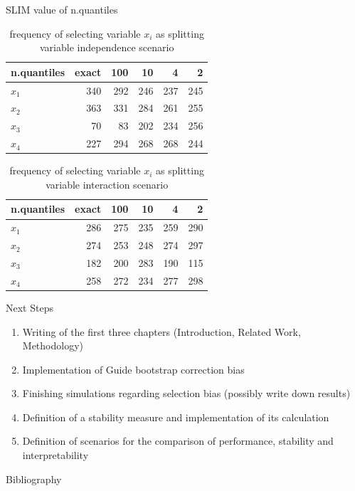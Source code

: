 \documentclass[9pt, xcolor=table]{beamer}
\begin{document}
\begin{frame}{SLIM value of n.quantiles}

\begin{table}

\caption{frequency of selecting variable $x_i$ as splitting variable independence scenario}
\centering
\begin{tabular}[t]{l|r|r|r|r|r}
\hline
n.quantiles  & exact & 100 & 10 & 4 & 2\\
\hline
$x_1$ & 340 & 292 & 246 & 237 & 245\\
\hline
$x_2$ & 363 & 331 & 284 & 261 & 255\\
\hline
$x_3$ & 70 & 83 & 202 & 234 & 256\\
\hline
$x_4$ & 227 & 294 & 268 & 268 & 244\\
\hline
\end{tabular}
\end{table}


\begin{table}
\caption{frequency of selecting variable $x_i$ as splitting variable interaction scenario}
\centering
\begin{tabular}[t]{l|r|r|r|r|r}
\hline
n.quantiles  & exact & 100 & 10 & 4 & 2\\
\hline
$x_1$ & 286 & 275 & 235 & 259 & 290\\
\hline
$x_2$ & 274 & 253 & 248 & 274 & 297\\
\hline
$x_3$ & 182 & 200 & 283 & 190 & 115\\
\hline
$x_4$ & 258 & 272 & 234 & 277 & 298\\
\hline
\end{tabular}
\end{table}


\end{frame}


\begin{frame}{Next Steps}
\begin{enumerate}
    \item Writing of the first three chapters (Introduction, Related Work, Methodology)
    \item Implementation of Guide bootstrap correction bias 
    \item Finishing simulations regarding selection bias (possibly write down results)
    \item Definition of a stability measure and implementation of its calculation
    \item Definition of scenarios for the comparison of performance, stability and interpretability
\end{enumerate}
    
\end{frame}
    


\begin{frame}{Bibliography}
    
    

\end{frame}
\end{document}
